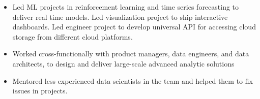 \documentclass[11pt,a4paper,roman]{moderncv}
\begin{document}
{{\begin{itemize}
\item Led ML projects in reinforcement learning and time series forecasting to deliver real time models. Led visualization project to ship interactive dashboards. Led engineer project to develop universal API for accessing cloud storage from different cloud platforms.
\item Worked cross-functionally with product managers, data engineers, and data architects, to design and deliver large-scale advanced analytic solutions
\item Mentored less experienced data scientists in the team and helped them to fix issues in projects.
\end{itemize}
}

}
\end{document}
